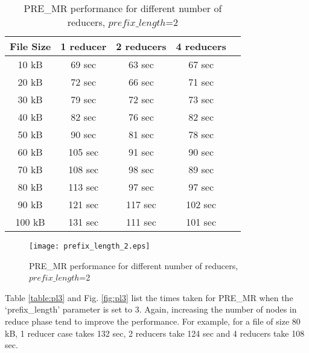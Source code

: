 \documentclass[conference]{IEEEtran}
\begin{document}
\begin{table}[htbp]
\caption{PRE\_MR performance for different number of reducers, $prefix\_length$=2}
\centering
\vspace{5pt}
\begin{tabular}{|c|c|c|c|c|}
\hline
\textbf{File Size} & \textbf{1 reducer} & \textbf{2 reducers} & \textbf{4 reducers}\\
\hline\hline
10 kB & 69 sec & 63 sec & 67 sec\\
\hline
20 kB & 72 sec & 66 sec &  71 sec \\
\hline
30 kB & 79 sec & 72 sec & 73 sec \\
\hline
40 kB & 82 sec & 76 sec & 82 sec \\
\hline
50 kB & 90 sec & 81 sec & 78 sec \\
\hline
60 kB & 105 sec & 91  sec & 90 sec \\
\hline
70 kB & 108 sec & 98  sec & 89 sec \\
\hline
80 kB & 113 sec & 97 sec & 97 sec \\
\hline
90 kB & 121 sec & 117  sec & 102 sec \\
\hline
100 kB & 131 sec & 111 sec & 101 sec  \\
\hline
\end{tabular}
\label{table:pl2}
\end{table}

\begin{figure}[htbp]
\begin{center}
\texttt{[image: prefix\_length\_2.eps]}
\end{center}
\caption{PRE\_MR performance for different number of reducers, $prefix\_length$=2}
\label{fig:pl2}
\end{figure}

Table \ref{table:pl3} and Fig. \ref{fig:pl3} list the times taken for PRE\_MR when the `prefix\_length' parameter is set to 3. Again, increasing the number of nodes in reduce phase tend to improve the performance. For example, for a file of size 80 kB, 1 reducer case takes 132 sec, 2 reducers take 124 sec and 4 reducers take 108 sec.
\end{document}
